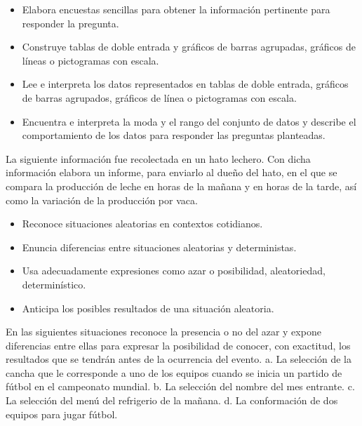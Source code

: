 
\evidencias

\begin{itemize}
  \item Elabora encuestas sencillas para obtener la información pertinente para responder la pregunta.
  \item Construye tablas de doble entrada y gráficos de barras agrupadas, gráficos de líneas o pictogramas con escala.
  \item Lee e interpreta los datos representados en tablas de doble entrada, gráficos de barras agrupados, gráficos de línea o pictogramas con escala.
  \item Encuentra e interpreta la moda y el rango del conjunto de datos y describe el comportamiento de los datos para responder las preguntas planteadas.
\end{itemize}

\ejemplo

La siguiente información fue recolectada en un hato lechero. Con dicha información elabora un informe, para enviarlo al dueño del hato, en el que se compara la producción de leche en horas de la mañana y en horas de la tarde, así como la variación de la producción por vaca.




\evidencias

\begin{itemize}
  \item Reconoce situaciones aleatorias en contextos cotidianos.
  \item Enuncia diferencias entre situaciones aleatorias y deterministas.
  \item Usa adecuadamente expresiones como azar o posibilidad, aleatoriedad, determinístico.
  \item Anticipa los posibles resultados de una situación aleatoria.
\end{itemize}

\ejemplo

En las siguientes situaciones reconoce la presencia o no del azar y expone diferencias entre ellas para expresar la posibilidad de conocer, con exactitud, los resultados que se tendrán antes de la ocurrencia del evento. a. La selección de la cancha que le corresponde a uno de los equipos cuando se inicia un partido de fútbol en el campeonato mundial. b. La selección del nombre del mes entrante. c. La selección del menú del refrigerio de la mañana. d. La conformación de dos equipos para jugar fútbol.


